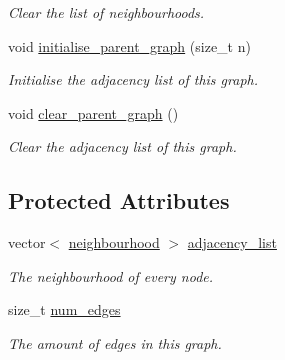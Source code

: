 \begin{DoxyCompactItemize}
\begin{DoxyCompactList}\small\item\em Clear the list of neighbourhoods. \end{DoxyCompactList}\item 
void \hyperlink{classlgraph_1_1utils_1_1xxgraph_abd983125be7f2f2b9c812326a4a39e6d}{initialise\+\_\+parent\+\_\+graph} (size\+\_\+t n)
\begin{DoxyCompactList}\small\item\em Initialise the adjacency list of this graph. \end{DoxyCompactList}\item 
void \hyperlink{classlgraph_1_1utils_1_1xxgraph_a8d213a8dfe716d344dd51d1bd37c0e2c}{clear\+\_\+parent\+\_\+graph} ()
\begin{DoxyCompactList}\small\item\em Clear the adjacency list of this graph. \end{DoxyCompactList}\end{DoxyCompactItemize}
\subsection*{Protected Attributes}
\begin{DoxyCompactItemize}
\item 
vector$<$ \hyperlink{namespacelgraph_1_1utils_ac52fa2c52f47820841e83a3da5d308bc}{neighbourhood} $>$ \hyperlink{classlgraph_1_1utils_1_1xxgraph_a1d5fda0d5aa89340f997428b982f966f}{adjacency\+\_\+list}\hypertarget{classlgraph_1_1utils_1_1xxgraph_a1d5fda0d5aa89340f997428b982f966f}{}\label{classlgraph_1_1utils_1_1xxgraph_a1d5fda0d5aa89340f997428b982f966f}

\begin{DoxyCompactList}\small\item\em The neighbourhood of every node. \end{DoxyCompactList}\item 
size\+\_\+t \hyperlink{classlgraph_1_1utils_1_1xxgraph_a217ebb1cd8946fedfbf94a9b22f7da48}{num\+\_\+edges}\hypertarget{classlgraph_1_1utils_1_1xxgraph_a217ebb1cd8946fedfbf94a9b22f7da48}{}\label{classlgraph_1_1utils_1_1xxgraph_a217ebb1cd8946fedfbf94a9b22f7da48}

\begin{DoxyCompactList}\small\item\em The amount of edges in this graph. \end{DoxyCompactList}\end{DoxyCompactItemize}


